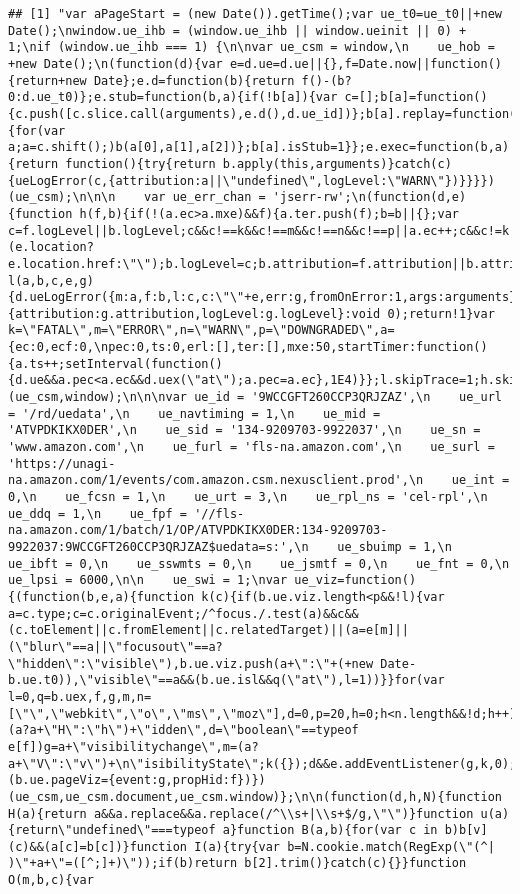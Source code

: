 \documentclass[
]{article}
\begin{document}
\begin{verbatim}
## [1] "var aPageStart = (new Date()).getTime();var ue_t0=ue_t0||+new Date();\nwindow.ue_ihb = (window.ue_ihb || window.ueinit || 0) + 1;\nif (window.ue_ihb === 1) {\n\nvar ue_csm = window,\n    ue_hob = +new Date();\n(function(d){var e=d.ue=d.ue||{},f=Date.now||function(){return+new Date};e.d=function(b){return f()-(b?0:d.ue_t0)};e.stub=function(b,a){if(!b[a]){var c=[];b[a]=function(){c.push([c.slice.call(arguments),e.d(),d.ue_id])};b[a].replay=function(b){for(var a;a=c.shift();)b(a[0],a[1],a[2])};b[a].isStub=1}};e.exec=function(b,a){return function(){try{return b.apply(this,arguments)}catch(c){ueLogError(c,{attribution:a||\"undefined\",logLevel:\"WARN\"})}}}})(ue_csm);\n\n\n    var ue_err_chan = 'jserr-rw';\n(function(d,e){function h(f,b){if(!(a.ec>a.mxe)&&f){a.ter.push(f);b=b||{};var c=f.logLevel||b.logLevel;c&&c!==k&&c!==m&&c!==n&&c!==p||a.ec++;c&&c!=k||a.ecf++;b.pageURL=\"\"+(e.location?e.location.href:\"\");b.logLevel=c;b.attribution=f.attribution||b.attribution;a.erl.push({ex:f,info:b})}}function l(a,b,c,e,g){d.ueLogError({m:a,f:b,l:c,c:\"\"+e,err:g,fromOnError:1,args:arguments},g?{attribution:g.attribution,logLevel:g.logLevel}:void 0);return!1}var k=\"FATAL\",m=\"ERROR\",n=\"WARN\",p=\"DOWNGRADED\",a={ec:0,ecf:0,\npec:0,ts:0,erl:[],ter:[],mxe:50,startTimer:function(){a.ts++;setInterval(function(){d.ue&&a.pec<a.ec&&d.uex(\"at\");a.pec=a.ec},1E4)}};l.skipTrace=1;h.skipTrace=1;h.isStub=1;d.ueLogError=h;d.ue_err=a;e.onerror=l})(ue_csm,window);\n\n\nvar ue_id = '9WCCGFT260CCP3QRJZAZ',\n    ue_url = '/rd/uedata',\n    ue_navtiming = 1,\n    ue_mid = 'ATVPDKIKX0DER',\n    ue_sid = '134-9209703-9922037',\n    ue_sn = 'www.amazon.com',\n    ue_furl = 'fls-na.amazon.com',\n    ue_surl = 'https://unagi-na.amazon.com/1/events/com.amazon.csm.nexusclient.prod',\n    ue_int = 0,\n    ue_fcsn = 1,\n    ue_urt = 3,\n    ue_rpl_ns = 'cel-rpl',\n    ue_ddq = 1,\n    ue_fpf = '//fls-na.amazon.com/1/batch/1/OP/ATVPDKIKX0DER:134-9209703-9922037:9WCCGFT260CCP3QRJZAZ$uedata=s:',\n    ue_sbuimp = 1,\n    ue_ibft = 0,\n    ue_sswmts = 0,\n    ue_jsmtf = 0,\n    ue_fnt = 0,\n    ue_lpsi = 6000,\n\n    ue_swi = 1;\nvar ue_viz=function(){(function(b,e,a){function k(c){if(b.ue.viz.length<p&&!l){var a=c.type;c=c.originalEvent;/^focus./.test(a)&&c&&(c.toElement||c.fromElement||c.relatedTarget)||(a=e[m]||(\"blur\"==a||\"focusout\"==a?\"hidden\":\"visible\"),b.ue.viz.push(a+\":\"+(+new Date-b.ue.t0)),\"visible\"==a&&(b.ue.isl&&q(\"at\"),l=1))}}for(var l=0,q=b.uex,f,g,m,n=[\"\",\"webkit\",\"o\",\"ms\",\"moz\"],d=0,p=20,h=0;h<n.length&&!d;h++)if(a=n[h],f=(a?a+\"H\":\"h\")+\"idden\",d=\"boolean\"==typeof e[f])g=a+\"visibilitychange\",m=(a?a+\"V\":\"v\")+\n\"isibilityState\";k({});d&&e.addEventListener(g,k,0);b.ue&&d&&(b.ue.pageViz={event:g,propHid:f})})(ue_csm,ue_csm.document,ue_csm.window)};\n\n(function(d,h,N){function H(a){return a&&a.replace&&a.replace(/^\\s+|\\s+$/g,\"\")}function u(a){return\"undefined\"===typeof a}function B(a,b){for(var c in b)b[v](c)&&(a[c]=b[c])}function I(a){try{var b=N.cookie.match(RegExp(\"(^| )\"+a+\"=([^;]+)\"));if(b)return b[2].trim()}catch(c){}}function O(m,b,c){var 
\end{verbatim}
\end{document}
